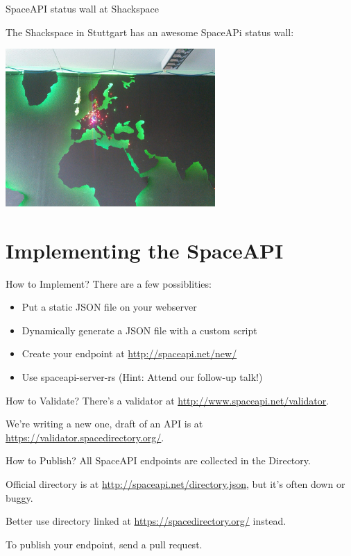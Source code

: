 \begin{frame}{SpaceAPI status wall at Shackspace}

	The Shackspace in Stuttgart has an awesome SpaceAPi status wall:
	
	\vspace{1em}
	\centerline{
		\includegraphics[width=0.6\textwidth]{what_is_the_spaceapi/statuswall.jpg}
	}

\end{frame}




\section{Implementing the SpaceAPI}

\begin{frame}{How to Implement?}
	There are a few possiblities:
	\pause
	\begin{itemize}
		\item Put a static JSON file on your webserver	
		\pause
		\item Dynamically generate a JSON file with a custom script
		\pause
		\item Create your endpoint at \url{http://spaceapi.net/new/}
		\pause
		\item Use spaceapi-server-rs (Hint: Attend our follow-up talk!)
	\end{itemize}
\end{frame}

\begin{frame}{How to Validate?}
	There's a validator at \url{http://www.spaceapi.net/validator}.

	We're writing a new one, draft of an API is at
	\url{https://validator.spacedirectory.org/}.
\end{frame}

\begin{frame}{How to Publish?}
	All SpaceAPI endpoints are collected in the Directory.

	Official directory is at \url{http://spaceapi.net/directory.json}, but it's
	often down or buggy.

	Better use directory linked at \url{https://spacedirectory.org/} instead.

	To publish your endpoint, send a pull request.
\end{frame}


